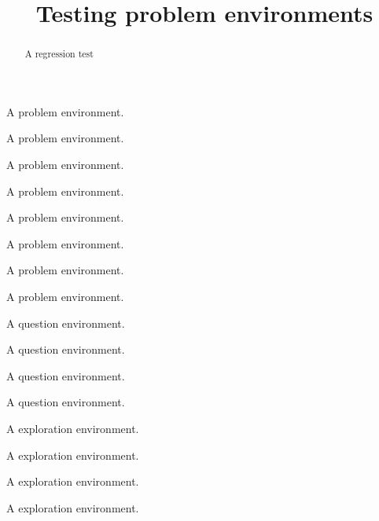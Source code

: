 \documentclass{ximera}
\title[Pretitle:]{Testing problem environments}
\begin{document}
\begin{abstract}
  A regression test
\end{abstract}
\maketitle

\begin{exercise}
  A problem environment.
\end{exercise}

\begin{exercise}[.5in]
  A problem environment.
\end{exercise}

\begin{exercise}
  A problem environment.
  \begin{exercise}
  A problem environment.
  \end{exercise}
\end{exercise}

\begin{problem}
  A problem environment.
\end{problem}

\begin{problem}[.5in]
  A problem environment.
\end{problem}

\begin{problem}
  A problem environment.
  \begin{problem}
  A problem environment.
  \end{problem}
\end{problem}

\begin{question}
  A question environment.
\end{question}

\begin{question}[.5in]
  A question environment.
\end{question}

\begin{question}
  A question environment.
  \begin{question}
  A question environment.
  \end{question}
\end{question}



\begin{exploration}
  A exploration environment.
\end{exploration}

\begin{exploration}[.5in]
  A exploration environment.
\end{exploration}

\begin{exploration}
  A exploration environment.
  \begin{exploration}
  A exploration environment.
  \end{exploration}
\end{exploration}
\end{document}
